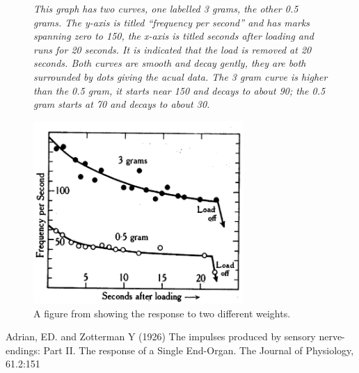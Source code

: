 \documentclass[12pt]{article}
\begin{document}
\begin{figure}[tb]
             {\textsl{This graph has two curves, one labelled 3 grams, the other 0.5 grams. The y-axis is titled ``frequency per second'' and has marks spanning zero to 150, the x-axis is titled seconds after loading and runs for 20 seconds. It is indicated that the load is removed at 20 seconds. Both curves are smooth and decay gently, they are both surrounded by dots giving the acual data. The 3 gram curve is higher than the 0.5 gram, it starts near 150 and decays to about 90; the 0.5 gram starts at 70 and decays to about 30.}}
             {
               \begin{center}
                 \includegraphics[width=8cm]{Adrian.png}
               \end{center}
             }
             \caption{A figure from \cite{AdrianZotterma1926} showing
               the response to two different weights.\label{fig_adrian}}
\end{figure}
\begin{thebibliography}{10}

  Adrian, ED. and Zotterman Y (1926) The impulses produced by sensory nerve-endings: Part II. The response of a Single End-Organ.
\newblock The Journal of Physiology, 61.2:151


\end{thebibliography}
\end{document}
